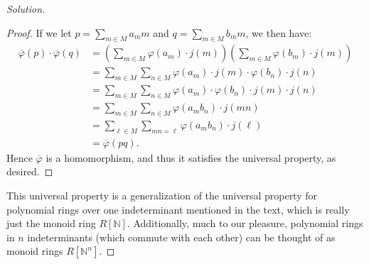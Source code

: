 \documentclass[12pt]{article}
\newenvironment{solution}
  {\renewcommand\qedsymbol{$\blacksquare$}\begin{proof}[Solution]}
{\end{proof}}
\newenvironment{sproof}{
  \renewcommand\qedsymbol{$\square$}
  \begin{proof}
  }{
  \end{proof}
}
\theoremstyle{remark}
\begin{document}
\begin{solution}
\begin{sproof}
  If we let $p=\sum_{m\in M}a_mm$ and $q=\sum_{m\in M}b_mm$, we then have:
    \begin{align*}
      \overline\varphi(p)\cdot \overline\varphi(q) 
      &= \left( \sum_{m\in M} \varphi(a_m)\cdot j(m) \right)
         \left( \sum_{m\in M} \varphi(b_m)\cdot j(m) \right) \\
      &= \sum_{m\in M} \sum_{n\in M} \varphi(a_m)\cdot j(m)\cdot \varphi(b_n)\cdot j(n) \\
      &= \sum_{m\in M} \sum_{n\in M} \varphi(a_m)\cdot \varphi(b_n)\cdot j(m)\cdot j(n) \\
      &= \sum_{m\in M} \sum_{n\in M} \varphi(a_mb_n)\cdot j(mn) \\
      &= \sum_{\ell\in M} \sum_{mn=\ell} \varphi(a_mb_n)\cdot j(\ell) \\
      &= \overline\varphi(pq).
    \end{align*}
    Hence $\overline\varphi$ is a homomorphism, and thus it satisfies the universal property, as
    desired.
  \end{sproof}
  \indent This universal property is a generalization of the universal property for polynomial rings over
  one indeterminant mentioned in the text, which is really just the monoid ring $R[\mathbb{N}]$.
  Additionally, much to our pleasure, polynomial rings in $n$ indeterminants (which commute with each other)
  can be thought of
  as monoid rings $R\left[\mathbb{N}^n\right]$.
\end{solution}
\end{document}
